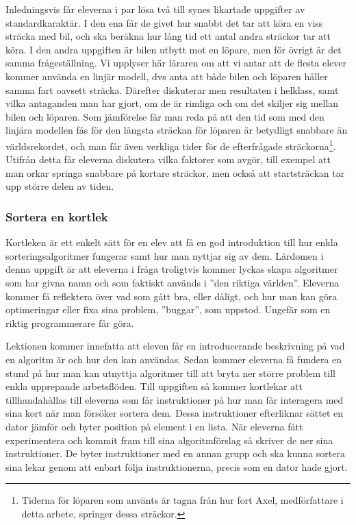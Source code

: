     \textcolor{lila}{Inledningsvis får eleverna i par lösa två till synes likartade uppgifter av standardkaraktär. I den ena får de givet hur snabbt det tar att köra en viss sträcka med bil, och ska beräkna hur lång tid ett antal andra sträckor tar att köra. I den andra uppgiften är bilen utbytt mot en löpare, men för övrigt är det samma frågeställning. Vi upplyser här läraren om att vi antar att de flesta elever kommer använda en linjär modell, dvs anta att både bilen och löparen håller samma fart oavsett sträcka. Därefter diskuterar men resultaten i helklass, samt vilka antaganden man har gjort, om de är rimliga och om det skiljer sig mellan bilen och löparen. Som jämförelse får man reda på att den tid som med den linjära modellen fås för den längsta sträckan för löparen är betydligt snabbare än världsrekordet, och man får även verkliga tider för de efterfrågade sträckorna\footnote{Tiderna för löparen som använts är tagna från hur fort Axel, medförfattare i detta arbete, springer dessa sträckor.}. Utifrån detta får eleverna diskutera vilka faktorer som avgör, till exempel att man orkar springa snabbare på kortare sträckor, men också att startsträckan tar upp större delen av tiden.}
    
\subsubsection{Sortera en kortlek}
    \label{sec:Sortera}
    
    \textcolor{WildStrawberry}{
        Kortleken är ett enkelt sätt för en elev att få en god introduktion till hur enkla sorteringsalgoritmer fungerar samt hur man nyttjar sig av dem. Lärdomen i denna uppgift är att eleverna i fråga troligtvis kommer lyckas skapa algoritmer som har givna namn och som faktiskt används i ''den riktiga världen''. Eleverna kommer få reflektera över vad som gått bra, eller dåligt, och hur man kan göra optimeringar eller fixa sina problem, ''buggar'', som uppstod. Ungefär som en riktig programmerare får göra. }
        
        
    \textcolor{WildStrawberry}{
        Lektionen kommer innefatta att eleven får en introducerande beskrivning på vad en algoritm är och hur den kan användas. Sedan kommer eleverna få fundera en stund på hur man kan utnyttja algoritmer till att bryta ner större problem till enkla upprepande arbetsflöden. Till uppgiften så kommer kortlekar att tillhandahållas till eleverna som får instruktioner på hur man får interagera med sina kort när man försöker sortera dem. Dessa instruktioner efterliknar sättet en dator jämför och byter position på element i en lista. När eleverna fått experimentera och kommit fram till sina algoritmförslag så skriver de ner sina instruktioner. De byter instruktioner med en annan grupp och ska kunna sortera sina lekar genom att enbart följa instruktionerna, precis som en dator hade gjort. }
        

